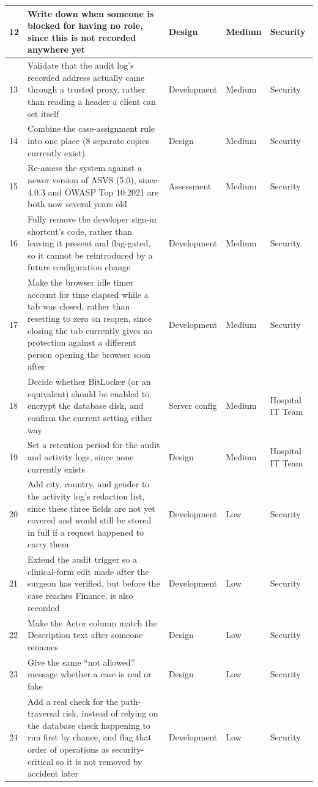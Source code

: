 \begin{longtable}{|p{0.6cm}|p{5.1cm}|p{2.5cm}|p{1.3cm}|p{4cm}|}
\hline
12 & Write down when someone is blocked for having no role, since this is not recorded anywhere yet & Design & Medium & Security \\
\hline
13 & Validate that the audit log's recorded address actually came through a trusted proxy, rather than reading a header a client can set itself & Development & Medium & Security \\
\hline
14 & Combine the case-assignment rule into one place (8 separate copies currently exist) & Design & Medium & Security \\
\hline
15 & Re-assess the system against a newer version of ASVS (5.0), since 4.0.3 and OWASP Top 10:2021 are both now several years old & Assessment & Medium & Security \\
\hline
16 & Fully remove the developer sign-in shortcut's code, rather than leaving it present and flag-gated, so it cannot be reintroduced by a future configuration change & Development & Medium & Security \\
\hline
17 & Make the browser idle timer account for time elapsed while a tab was closed, rather than resetting to zero on reopen, since closing the tab currently gives no protection against a different person opening the browser soon after & Development & Medium & Security \\
\hline
18 & Decide whether BitLocker (or an equivalent) should be enabled to encrypt the database disk, and confirm the current setting either way & Server config & Medium & Hospital IT Team \\
\hline
19 & Set a retention period for the audit and activity logs, since none currently exists & Design & Medium & Hospital IT Team \\
\hline
20 & Add city, country, and gender to the activity log's redaction list, since these three fields are not yet covered and would still be stored in full if a request happened to carry them & Development & Low & Security \\
\hline
21 & Extend the audit trigger so a clinical-form edit made after the surgeon has verified, but before the case reaches Finance, is also recorded & Development & Low & Security \\
\hline
22 & Make the Actor column match the Description text after someone renames & Design & Low & Security \\
\hline
23 & Give the same ``not allowed'' message whether a case is real or fake & Design & Low & Security \\
\hline
24 & Add a real check for the path-traversal risk, instead of relying on the database check happening to run first by chance, and flag that order of operations as security-critical so it is not removed by accident later & Development & Low & Security \\
\hline
\end{longtable}
